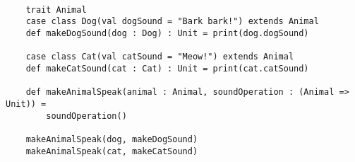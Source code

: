 \begin{lstlisting}[caption={Interfaces em Programação Funcional},label=fpinterface2]
    
    trait Animal
    case class Dog(val dogSound = "Bark bark!") extends Animal
    def makeDogSound(dog : Dog) : Unit = print(dog.dogSound)
    
    case class Cat(val catSound = "Meow!") extends Animal
    def makeCatSound(cat : Cat) : Unit = print(cat.catSound)

    def makeAnimalSpeak(animal : Animal, soundOperation : (Animal => Unit)) =
        soundOperation()
    
    makeAnimalSpeak(dog, makeDogSound)
    makeAnimalSpeak(cat, makeCatSound)

\end{lstlisting}


%
%
%    
%
%
%
%

